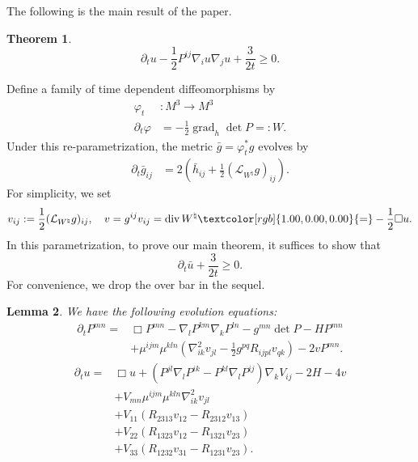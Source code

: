 \documentclass{amsart}
\newtheorem{theorem}{Theorem}
\newtheorem{lemma}[theorem]{Lemma}
\theoremstyle{definition}
\theoremstyle{remark}
\numberwithin{equation}{section}
\begin{document}
The following is the main result of the paper.
\begin{theorem}
\[\partial_t u-\frac{1}{2}P^{ij}\nabla_iu\nabla_ju+\frac{3}{2t}\geq 0. \]
\end{theorem}
Define a family of time dependent diffeomorphisms by
\begin{align*}
\varphi_t&:M^3\to M^3\\
\partial_t\varphi&=-\frac{1}{2}\operatorname{grad}_h\det P=:W.
\end{align*}
Under this re-parametrization, the metric $\bar{g}=\varphi_t^{\ast}g$ evolves by
\begin{align}
\partial_t \bar{g}_{ij}&=2(\bar{h}_{ij}+\frac{1}{2}(\mathcal{L}_{W^{\natural}}g)_{ij}).
\end{align}
For simplicity, we set
\begin{align}
v_{ij}:=\frac{1}{2}(\mathcal{L}_{W^{\natural}}g)_{ij},\quad v=g^{ij}v_{ij}=\operatorname{div}W^{\natural}\textcolor[rgb]{1.00,0.00,0.00}{=}-\frac{1}{2}\Box u.
\end{align}
In this parametrization, to prove our main theorem, it suffices to show that
\[\partial_t \bar{u}+\frac{3}{2t}\geq 0. \]
For convenience, we drop the over bar in the sequel.
\begin{lemma}
We have the following evolution equations:
\begin{align}
\partial_tP^{mn}=&\Box P^{mn}-\nabla_lP^{km}\nabla_kP^{ln}-g^{mn}\det P-HP^{mn}\\
&+\mu^{ijm}\mu^{kln}\left(\nabla^2_{ik}v_{jl}-\frac{1}{2}g^{pq}R_{ijpl}v_{qk}\right)-2vP^{mn}.
\end{align}
\begin{align}
\partial_t u=&\Box u+\left(P^{jl}\nabla_lP^{ik}-P^{kl}\nabla_l P^{ij}\right)\nabla_kV_{ij}-2H-4v\\
&+V_{mn}\mu^{ijm}\mu^{kln}\nabla^2_{ik}v_{jl}\\
&+V_{11}\left(R_{2313}v_{12}-R_{2312}v_{13}\right)\\
&+V_{22}\left(R_{1323}v_{12}-R_{1321}v_{23}\right)\\
&+V_{33}\left(R_{1232}v_{31}-R_{1231}v_{23}\right).
\end{align}
\end{lemma}
\end{document}
